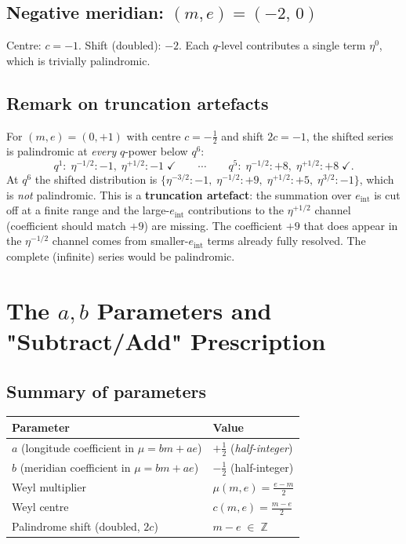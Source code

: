 \documentclass[12pt,a4paper]{article}
\newcommand{\ZZ}{\mathbb{Z}}
\theoremstyle{definition}
\begin{document}
\subsection{Negative meridian: \texorpdfstring{$(m,e)=(-2,\,0)$}{(m,e)=(-2,0)}}

Centre: $c = -1$.  Shift (doubled): $-2$.
Each $q$-level contributes a single term $\eta^0$, which is trivially
palindromic. \checkmark

\subsection{Remark on truncation artefacts}

For $(m,e) = (0,+1)$ with centre $c = -\tfrac12$ and shift $2c = -1$,
the shifted series is palindromic at \emph{every} $q$-power below $q^6$:
\[
  q^1:\; \eta^{-1/2}{:}-1,\; \eta^{+1/2}{:}-1 \;\checkmark
  \qquad \cdots \qquad
  q^{5}:\; \eta^{-1/2}{:}+8,\; \eta^{+1/2}{:}+8 \;\checkmark.
\]
At $q^6$ the shifted distribution is
$\{\eta^{-3/2}{:}-1,\;\eta^{-1/2}{:}+9,\;\eta^{+1/2}{:}+5,\;\eta^{3/2}{:}-1\}$,
which is \emph{not} palindromic.  This is a \textbf{truncation artefact}:
the summation over $e_{\mathrm{int}}$ is cut off at a finite range and
the large-$e_{\mathrm{int}}$ contributions to the $\eta^{+1/2}$ channel
(coefficient should match $+9$) are missing.  The coefficient $+9$
that does appear in the $\eta^{-1/2}$ channel comes from
smaller-$e_{\mathrm{int}}$ terms already fully resolved.
The complete (infinite) series would be palindromic.

\section{The \texorpdfstring{$a,b$}{a,b} Parameters and
  "Subtract/Add" Prescription}

\subsection{Summary of parameters}

\begin{center}
\begin{tabular}{ll}
\toprule
Parameter & Value \\
\midrule
$a$ (longitude coefficient in $\mu=bm+ae$) & $+\tfrac{1}{2}$ (\emph{half-integer}) \\
$b$ (meridian coefficient in $\mu=bm+ae$)  & $-\tfrac{1}{2}$ (half-integer) \\
Weyl multiplier                             & $\mu(m,e) = \tfrac{e-m}{2}$ \\
Weyl centre                                 & $c(m,e) = \tfrac{m-e}{2}$ \\
Palindrome shift (doubled, $2c$)            & $m - e \;\in\; \ZZ$ \\
\bottomrule
\end{tabular}
\end{center}
\end{document}
